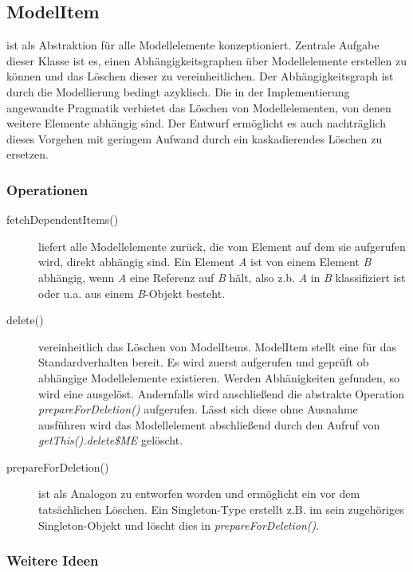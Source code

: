 \subsection{ModelItem}

 ist als Abstraktion für alle Modellelemente konzeptioniert. 
Zentrale Aufgabe dieser Klasse ist es, einen Abhängigkeitsgraphen über Modellelemente erstellen zu können und 
das Löschen dieser zu vereinheitlichen. Der Abhängigkeitsgraph ist durch die Modellierung bedingt azyklisch.
Die in der Implementierung angewandte Pragmatik verbietet das Löschen von Modellelementen, von denen weitere Elemente 
abhängig sind. Der Entwurf ermöglicht es auch nachträglich dieses Vorgehen mit geringem Aufwand durch ein kaskadierendes Löschen zu 
ersetzen. 



\subsubsection{Operationen}
\begin{description}
\item[fetchDependentItems()] 
liefert alle Modellelemente zurück, die vom Element auf dem sie aufgerufen wird, direkt abhängig sind.
Ein Element \emph{A} ist von einem Element \emph{B} abhängig, wenn \emph{A} eine Referenz auf \emph{B} hält, also z.b.   
\emph{A} in \emph{B} klassifiziert ist oder u.a. aus einem \emph{B}-Objekt besteht.
 
\item[delete()] vereinheitlich das Löschen von ModelItems. ModelItem stellt eine  für das 
Standardverhalten bereit. Es wird zuerst  aufgerufen und geprüft ob abhängige Modellelemente 
existieren. Werden Abhänigkeiten gefunden, so wird eine  ausgelöst. Andernfalls wird anschließend 
die abstrakte Operation \emph{prepareForDeletion()} aufgerufen. Lässt sich diese ohne Ausnahme ausführen wird das Modellelement 
abschließend durch den Aufruf von \emph{getThis().delete\$ME} gelöscht.

\item[prepareForDeletion()] ist als Analogon zu  entworfen worden und ermöglicht ein 
 vor dem tatsächlichen Löschen. Ein Singleton-Type erstellt z.B. im  sein zugehöriges 
Singleton-Objekt und löscht dies in \emph{prepareForDeletion()}. 

\end{description}
\subsubsection{Weitere Ideen}

